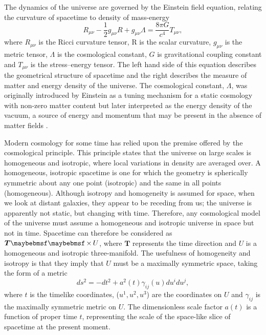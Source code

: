 The dynamics of the universe are governed by the Einstein field equation, relating the curvature of spacetime to density of mass-energy \cite{Gravity}
%
\begin{equation}\label{eq:einstein_field_eq}
  R_{\mu\nu} - \frac{1}{2} g_{\mu\nu}R + g_{\mu\nu}\Lambda = \frac{8\pi{}G}{c^4} T_{\mu\nu},
\end{equation}
%
where $R_{\mu\nu}$ is the Ricci curvature tensor, R is the scalar curvature, $g_{\mu\nu}$ is the metric tensor, $\Lambda$ is the cosmological constant, $G$ is gravitational coupling constant and $T_{\mu\nu}$ is the stress–energy tensor. The left hand side of this equation describes the geometrical structure of spacetime and the right describes the measure of matter and energy density of the universe. The cosmological constant, $\Lambda$, was originally introduced by Einstein as a tuning mechanism for a static cosmology with non-zero matter content but later interpreted as the energy density of the vacuum, a source of energy and momentum that may be present in the absence of matter fields \cite{SeanC}.

Modern cosmology for some time has relied upon the premise offered by the cosmological principle. This principle states that the universe on large scales is homogeneous and isotropic, where local variations in density are averaged over. A homogeneous, isotropic spacetime is one for which the geometry is spherically symmetric about any one point (isotropic) and the same in all points (homogeneous). Although isotropy and homogeneity is assumed for space, when we look at distant galaxies, they appear to be receding from us; the universe is apparently not static, but changing with time. Therefore, any cosmological model of the universe must assume a homogeneous and isotropic universe in space but not in time. Spacetime can therefore be considered as $\boldsymbol{T} \cross U$, where $\boldsymbol{T}$ represents the time direction and $U$ is a homogeneous and isotropic three-manifold. The usefulness of homogeneity and isotropy is that they imply that $U$ must be a maximally symmetric space, taking the form of a metric
%
\begin{equation}
    ds^{2} = -dt^{2} + a^{2}(t)\gamma_{ij}(u)du^{i}du^{j},  
\end{equation}
%
where $t$ is the timelike coordinates, ($u^1, u^2, u^3$) are the coordinates on $U$ and $\gamma_{ij}$ is the maximally symmetric metric on $U$. The dimensionless scale factor $a(t)$ is a function of proper time $t$, representing the scale of the space-like slice of spacetime at the present moment.

